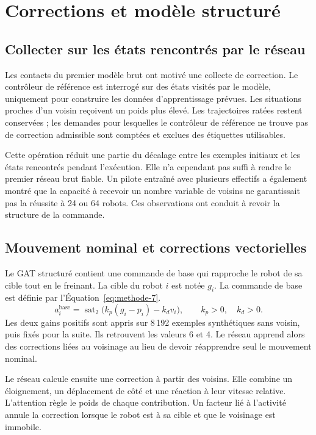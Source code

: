 \section{Corrections et modèle structuré}
\subsection{Collecter sur les états rencontrés par le réseau}
Les contacts du premier modèle brut ont motivé une collecte de correction. Le contrôleur de référence est interrogé sur des états visités par le modèle, uniquement pour construire les données d'apprentissage prévues. Les situations proches d'un voisin reçoivent un poids plus élevé. Les trajectoires ratées restent conservées ; les demandes pour lesquelles le contrôleur de référence ne trouve pas de correction admissible sont comptées et exclues des étiquettes utilisables.

Cette opération réduit une partie du décalage entre les exemples initiaux et les états rencontrés pendant l'exécution. Elle n'a cependant pas suffi à rendre le premier réseau brut fiable. Un pilote entraîné avec plusieurs effectifs a également montré que la capacité à recevoir un nombre variable de voisins ne garantissait pas la réussite à 24 ou 64 robots. Ces observations ont conduit à revoir la structure de la commande.

\subsection{Mouvement nominal et corrections vectorielles}
Le GAT structuré contient une commande de base qui rapproche le robot de sa cible tout en le freinant. La cible du robot $i$ est notée $g_i$.
La commande de base est définie par l'Équation~\eqref{eq:methode-7}.
\begin{equation}
a_i^{\mathrm{base}}=\operatorname{sat}_{2}\big(k_p(g_i-p_i)-k_dv_i\big),
\qquad k_p>0,\quad k_d>0.
\label{eq:methode-7}
\end{equation}
Les deux gains positifs sont appris sur 8\,192 exemples synthétiques sans voisin, puis fixés pour la suite. Ils retrouvent les valeurs 6 et 4. Le réseau apprend alors des corrections liées au voisinage au lieu de devoir réapprendre seul le mouvement nominal.

Le réseau calcule ensuite une correction à partir des voisins. Elle combine un éloignement, un déplacement de côté et une réaction à leur vitesse relative. L'attention règle le poids de chaque contribution. Un facteur lié à l'activité annule la correction lorsque le robot est à sa cible et que le voisinage est immobile.

